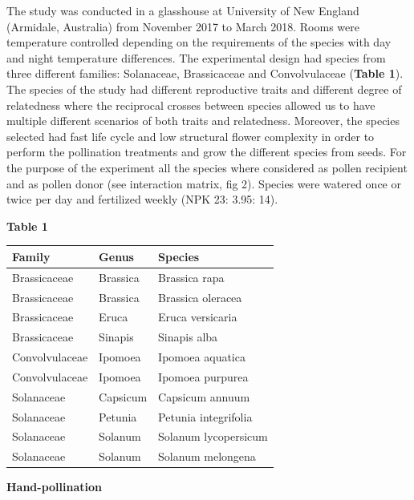\documentclass[11pt,a4paper]{article}
\begin{document}
The study was conducted in a glasshouse at University of New England
(Armidale, Australia) from November 2017 to March 2018. Rooms were
temperature controlled depending on the requirements of the species with
day and night temperature differences. The experimental design had
species from three different families: Solanaceae, Brassicaceae and
Convolvulaceae (\textbf{Table 1}). The species of the study had
different reproductive traits and different degree of relatedness where
the reciprocal crosses between species allowed us to have multiple
different scenarios of both traits and relatedness. Moreover, the
species selected had fast life cycle and low structural flower
complexity in order to perform the pollination treatments and grow the
different species from seeds. For the purpose of the experiment all the
species where considered as pollen recipient and as pollen donor (see
interaction matrix, fig 2). Species were watered once or twice per day
and fertilized weekly (NPK 23: 3.95: 14).

\textbf{Table 1}

\begin{longtable}[]{@{}lll@{}}
\toprule
Family & Genus & Species\tabularnewline
\midrule
\endhead
Brassicaceae & Brassica & Brassica rapa\tabularnewline
Brassicaceae & Brassica & Brassica oleracea\tabularnewline
Brassicaceae & Eruca & Eruca versicaria\tabularnewline
Brassicaceae & Sinapis & Sinapis alba\tabularnewline
Convolvulaceae & Ipomoea & Ipomoea aquatica\tabularnewline
Convolvulaceae & Ipomoea & Ipomoea purpurea\tabularnewline
Solanaceae & Capsicum & Capsicum annuum\tabularnewline
Solanaceae & Petunia & Petunia integrifolia\tabularnewline
Solanaceae & Solanum & Solanum lycopersicum\tabularnewline
Solanaceae & Solanum & Solanum melongena\tabularnewline
\bottomrule
\end{longtable}

\textbf{Hand-pollination}
\end{document}
